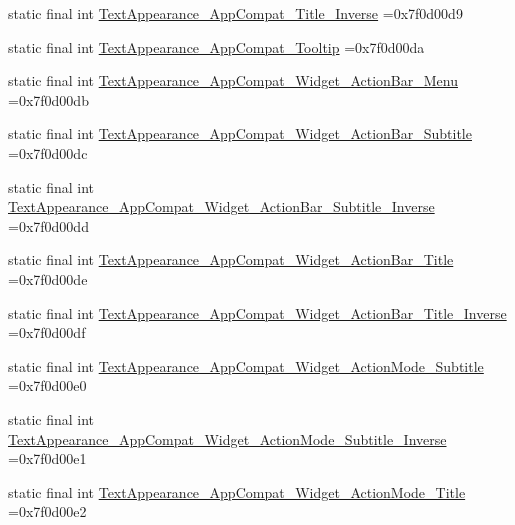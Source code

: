 \begin{DoxyCompactItemize}
\item 
static final int \mbox{\hyperlink{classcom_1_1example_1_1trainawearapplication_1_1_r_1_1style_a6d03979a9b7b7ce17e8e744af74b02d7}{Text\+Appearance\+\_\+\+App\+Compat\+\_\+\+Title\+\_\+\+Inverse}} =0x7f0d00d9
\item 
static final int \mbox{\hyperlink{classcom_1_1example_1_1trainawearapplication_1_1_r_1_1style_aa8090b92ab4edceb006b399b544bd113}{Text\+Appearance\+\_\+\+App\+Compat\+\_\+\+Tooltip}} =0x7f0d00da
\item 
static final int \mbox{\hyperlink{classcom_1_1example_1_1trainawearapplication_1_1_r_1_1style_abf31ab39c4351a089adfa02120c96540}{Text\+Appearance\+\_\+\+App\+Compat\+\_\+\+Widget\+\_\+\+Action\+Bar\+\_\+\+Menu}} =0x7f0d00db
\item 
static final int \mbox{\hyperlink{classcom_1_1example_1_1trainawearapplication_1_1_r_1_1style_a3884e977c312524fb04478dfa3439f01}{Text\+Appearance\+\_\+\+App\+Compat\+\_\+\+Widget\+\_\+\+Action\+Bar\+\_\+\+Subtitle}} =0x7f0d00dc
\item 
static final int \mbox{\hyperlink{classcom_1_1example_1_1trainawearapplication_1_1_r_1_1style_a5929c62984eea88419217c05ef09bd6c}{Text\+Appearance\+\_\+\+App\+Compat\+\_\+\+Widget\+\_\+\+Action\+Bar\+\_\+\+Subtitle\+\_\+\+Inverse}} =0x7f0d00dd
\item 
static final int \mbox{\hyperlink{classcom_1_1example_1_1trainawearapplication_1_1_r_1_1style_a17da5a237e988ef0273507c195ae4c09}{Text\+Appearance\+\_\+\+App\+Compat\+\_\+\+Widget\+\_\+\+Action\+Bar\+\_\+\+Title}} =0x7f0d00de
\item 
static final int \mbox{\hyperlink{classcom_1_1example_1_1trainawearapplication_1_1_r_1_1style_ab11005420679a401a3d5eb28dd5788b8}{Text\+Appearance\+\_\+\+App\+Compat\+\_\+\+Widget\+\_\+\+Action\+Bar\+\_\+\+Title\+\_\+\+Inverse}} =0x7f0d00df
\item 
static final int \mbox{\hyperlink{classcom_1_1example_1_1trainawearapplication_1_1_r_1_1style_a86fe68ba4a73f191f72ddd73ad70c132}{Text\+Appearance\+\_\+\+App\+Compat\+\_\+\+Widget\+\_\+\+Action\+Mode\+\_\+\+Subtitle}} =0x7f0d00e0
\item 
static final int \mbox{\hyperlink{classcom_1_1example_1_1trainawearapplication_1_1_r_1_1style_a4fbb908ce99d6775cb4173244e05483a}{Text\+Appearance\+\_\+\+App\+Compat\+\_\+\+Widget\+\_\+\+Action\+Mode\+\_\+\+Subtitle\+\_\+\+Inverse}} =0x7f0d00e1
\item 
static final int \mbox{\hyperlink{classcom_1_1example_1_1trainawearapplication_1_1_r_1_1style_aa2845367552c0d82a68eb559fb0e800a}{Text\+Appearance\+\_\+\+App\+Compat\+\_\+\+Widget\+\_\+\+Action\+Mode\+\_\+\+Title}} =0x7f0d00e2

\end{DoxyCompactItemize}
